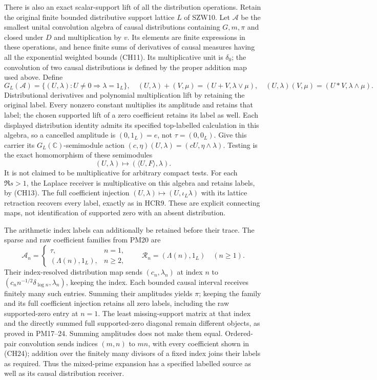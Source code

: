 \documentclass[
  10pt,
  a4paper,
]{article}
\begin{document}
There is also an exact scalar-support lift of all the distribution
operations. Retain the original finite bounded distributive support
lattice \(L\) of SZW10. Let \(\mathscr A\) be the smallest unital
convolution algebra of causal distributions containing \(G,m,\pi\) and
closed under \(D\) and multiplication by \(v\). Its elements are finite
expressions in these operations, and hence finite sums of derivatives of
causal measures having all the exponential weighted bounds (CH11). Its
multiplicative unit is \(\delta_0\); the convolution of two causal
distributions is defined by the proper addition map used above. Define
\[
G_L(\mathscr A)=\{(U,\lambda):U\ne0\Rightarrow\lambda=1_L\},\quad
(U,\lambda)+(V,\mu)=(U+V,\lambda\vee\mu),\quad
(U,\lambda)(V,\mu)=(U*V,\lambda\wedge\mu).
\tag{CH28}
\] Distributional derivatives and polynomial multiplication lift by
retaining the original label. Every nonzero constant multiplies its
amplitude and retains that label; the chosen supported lift of a zero
coefficient retains its label as well. Each displayed distribution
identity admits its specified top-labelled calculation in this algebra,
so a cancelled amplitude is \((0,1_L)=e\), not \(\tau=(0,0_L)\). Give
this carrier its \(G_L(\mathbb C)\)-semimodule action
\((c,\eta)(U,\lambda)=(cU,\eta\wedge\lambda)\). Testing is the exact
homomorphism of these semimodules \[
(U,\lambda)\longmapsto(\langle U,F\rangle,\lambda).
\tag{CH29}
\] It is not claimed to be multiplicative for arbitrary compact tests.
For each \(\Re s>1\), the Laplace receiver is multiplicative on this
algebra and retains labels, by (CH13). The full coefficient injection
\((U,\lambda)\mapsto(U,\iota_L\lambda)\) with its lattice retraction
recovers every label, exactly as in HCR9. These are explicit connecting
maps, not identification of supported zero with an absent distribution.

The arithmetic index labels can additionally be retained before their
trace. The sparse and raw coefficient families from PM20 are \[
\mathcal A_n=\begin{cases}\tau,&n=1,\\(\Lambda(n),1_L),&n\ge2,\end{cases}
\qquad \mathcal R_n=(\Lambda(n),1_L)\quad(n\ge1).
\tag{CH30}
\] Their index-resolved distribution map sends \((c_n,\lambda_n)\) at
index \(n\) to \((c_n n^{-1/2}\delta_{\log n},\lambda_n)\), keeping the
index. Each bounded causal interval receives finitely many such entries.
Summing their amplitudes yields \(\pi\); keeping the family and its full
coefficient injection retains all zero labels, including the raw
supported-zero entry at \(n=1\). The least missing-support matrix at
that index and the directly summed full supported-zero diagonal remain
different objects, as proved in PM17--24. Summing amplitudes does not
make them equal. Ordered-pair convolution sends indices \((m,n)\) to
\(mn\), with every coefficient shown in (CH24); addition over the
finitely many divisors of a fixed index joins their labels as required.
Thus the mixed-prime expansion has a specified labelled source as well
as its causal distribution receiver.
\end{document}

